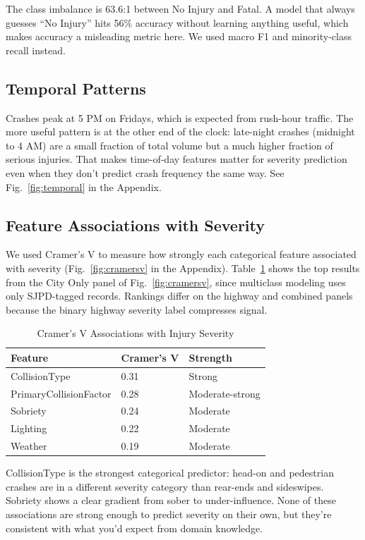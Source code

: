 \documentclass[conference]{IEEEtran}
\begin{document}
The class imbalance is 63.6:1 between No Injury and Fatal. A model that always guesses ``No Injury'' hits 56\% accuracy without learning anything useful, which makes accuracy a misleading metric here. We used macro F1 and minority-class recall instead.

\subsection{Temporal Patterns}

Crashes peak at 5 PM on Fridays, which is expected from rush-hour traffic. The more useful pattern is at the other end of the clock: late-night crashes (midnight to 4 AM) are a small fraction of total volume but a much higher fraction of serious injuries. That makes time-of-day features matter for severity prediction even when they don't predict crash frequency the same way. See Fig.~\ref{fig:temporal} in the Appendix.

\subsection{Feature Associations with Severity}

We used Cramer's V to measure how strongly each categorical feature associated with severity (Fig.~\ref{fig:cramersv} in the Appendix). Table~\ref{tab:cramersv} shows the top results from the City Only panel of Fig.~\ref{fig:cramersv}, since multiclass modeling uses only SJPD-tagged records. Rankings differ on the highway and combined panels because the binary highway severity label compresses signal.

\begin{table}[H]
  \centering
  \caption{Cramer's V Associations with Injury Severity}
  \label{tab:cramersv}
  \begin{tabular}{@{}lll@{}}
    \toprule
    Feature & Cramer's V & Strength \\
    \midrule
    CollisionType & 0.31 & Strong \\
    PrimaryCollisionFactor & 0.28 & Moderate-strong \\
    Sobriety & 0.24 & Moderate \\
    Lighting & 0.22 & Moderate \\
    Weather & 0.19 & Moderate \\
    \bottomrule
  \end{tabular}
\end{table}

CollisionType is the strongest categorical predictor: head-on and pedestrian crashes are in a different severity category than rear-ends and sideswipes. Sobriety shows a clear gradient from sober to under-influence. None of these associations are strong enough to predict severity on their own, but they're consistent with what you'd expect from domain knowledge.
\end{document}
